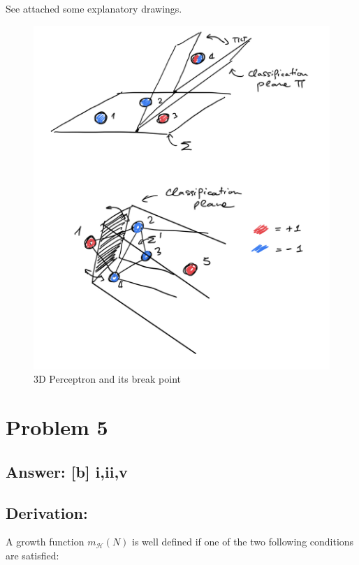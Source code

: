 \documentclass[11pt]{article}
\begin{document}
See attached some explanatory drawings.
\begin{figure}
    \centering
    \includegraphics[scale=0.8]{Pset 3/IMG_0163.jpg}
    \caption{3D Perceptron and its break point}
    \label{fig:my_label}
\end{figure}
        
    \hypertarget{problem-5}{%
\section{Problem 5}\label{problem-5}}

\hypertarget{answer-b-iiiv}{%
\subsection{Answer: {[}b{]} i,ii,v}\label{answer-b-iiiv}}

\hypertarget{derivation}{%
\subsection{Derivation:}\label{derivation}}

A growth function \(m_{\mathcal{H}}(N)\) is well defined if one of the
two following conditions are satisfied:
\end{document}
